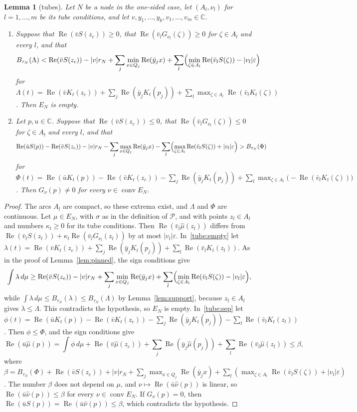 \documentclass[11pt]{amsart}
\newtheorem{lemma}[theorem]{Lemma}
\theoremstyle{definition}
\theoremstyle{remark}
\numberwithin{equation}{section}
\newcommand{\C}{\mathbb{C}}
\newcommand{\re}{\operatorname{Re}}
\begin{document}
\begin{lemma}[tubes]\label{lem:tubes}
Let $N$ be a node in the one-sided case, let $(A_l,\nu_l)$ for $l=1,\dots,m$ be its tube conditions, and let $v,y_1,\dots,y_k,v_1,\dots,v_m\in\C$.
\begin{enumerate}[label=(\alph*)]
\item\label{tube:empty} Suppose that $\re(\bar vS(z_c))\ge0$, that $\re(\bar v_lG_{\nu_l}(\zeta))\ge0$ for $\zeta\in A_l$ and every $l$, and that
\[
B_{\tau_N}(\Lambda)<\re(\bar vS(z_c))-|v|r_N+\sum_j\min_{x\in Q_j}\re(\bar y_jx)+\sum_l\Bigl(\min_{\zeta\in A_l}\re(\bar v_lS(\zeta))-|v_l|\varepsilon\Bigr)
\]
for $\Lambda(t)=\re(\bar vK_t(z_c))+\sum_j\re(\bar y_jK_t(p_j))+\sum_l\max_{\zeta\in A_l}\re(\bar v_lK_t(\zeta))$. Then $E_N$ is empty.
\item\label{tube:sep} Let $p,u\in\C$. Suppose that $\re(\bar vS(z_c))\le0$, that $\re(\bar v_lG_{\nu_l}(\zeta))\le0$ for $\zeta\in A_l$ and every $l$, and that
\[
\re(\bar uS(p))-\re(\bar vS(z_c))-|v|r_N-\sum_j\max_{x\in Q_j}\re(\bar y_jx)-\sum_l\Bigl(\max_{\zeta\in A_l}\re(\bar v_lS(\zeta))+|v_l|\varepsilon\Bigr)>B_{\tau_N}(\Phi)
\]
for $\Phi(t)=\re(\bar uK_t(p))-\re(\bar vK_t(z_c))-\sum_j\re(\bar y_jK_t(p_j))+\sum_l\max_{\zeta\in A_l}\bigl(-\re(\bar v_lK_t(\zeta))\bigr)$. Then $G_\nu(p)\ne0$ for every $\nu\in\operatorname{conv}E_N$.
\end{enumerate}
\end{lemma}

\begin{proof}
The arcs $A_l$ are compact, so these extrema exist, and $\Lambda$ and $\Phi$ are continuous. Let $\mu\in E_N$, with $\sigma$ as in the definition of $\mathcal P$, and with points $z_l\in A_l$ and numbers $\kappa_l\ge0$ for its tube conditions. Then $\re(\bar v_l\hat\mu(z_l))$ differs from $\re(\bar v_lS(z_l))+\kappa_l\re(\bar v_lG_{\nu_l}(z_l))$ by at most $|v_l|\varepsilon$. In~\ref{tube:empty} let $\lambda(t)=\re(\bar vK_t(z_c))+\sum_j\re(\bar y_jK_t(p_j))+\sum_l\re(\bar v_lK_t(z_l))$. As in the proof of Lemma~\ref{lem:pinned}, the sign conditions give
\[
\int\lambda\,d\mu\ge\re(\bar vS(z_c))-|v|r_N+\sum_j\min_{x\in Q_j}\re(\bar y_jx)+\sum_l\Bigl(\min_{\zeta\in A_l}\re(\bar v_lS(\zeta))-|v_l|\varepsilon\Bigr),
\]
while $\int\lambda\,d\mu\le B_{\tau_N}(\lambda)\le B_{\tau_N}(\Lambda)$ by Lemma~\ref{lem:support}, because $z_l\in A_l$ gives $\lambda\le\Lambda$. This contradicts the hypothesis, so $E_N$ is empty. In~\ref{tube:sep} let $\phi(t)=\re(\bar uK_t(p))-\re(\bar vK_t(z_c))-\sum_j\re(\bar y_jK_t(p_j))-\sum_l\re(\bar v_lK_t(z_l))$. Then $\phi\le\Phi$, and the sign conditions give
\[
\re(\bar u\hat\mu(p))=\int\phi\,d\mu+\re(\bar v\hat\mu(z_c))+\sum_j\re(\bar y_j\hat\mu(p_j))+\sum_l\re(\bar v_l\hat\mu(z_l))\le\beta,
\]
where $\beta=B_{\tau_N}(\Phi)+\re(\bar vS(z_c))+|v|r_N+\sum_j\max_{x\in Q_j}\re(\bar y_jx)+\sum_l(\max_{\zeta\in A_l}\re(\bar v_lS(\zeta))+|v_l|\varepsilon)$. The number $\beta$ does not depend on $\mu$, and $\nu\mapsto\re(\bar u\hat\nu(p))$ is linear, so $\re(\bar u\hat\nu(p))\le\beta$ for every $\nu\in\operatorname{conv}E_N$. If $G_\nu(p)=0$, then $\re(\bar uS(p))=\re(\bar u\hat\nu(p))\le\beta$, which contradicts the hypothesis.
\end{proof}
\end{document}
